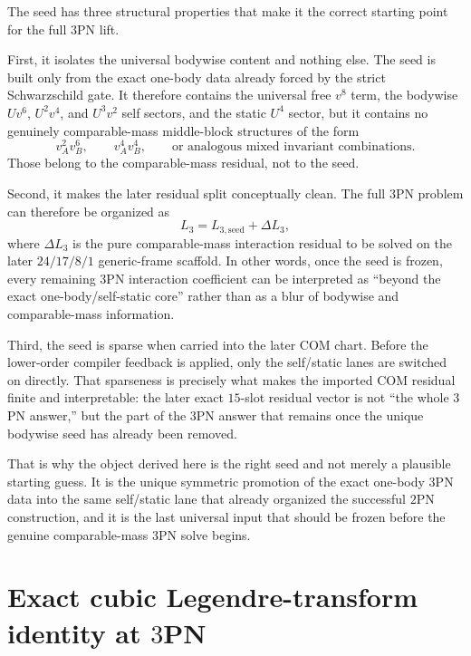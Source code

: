 \documentclass[11pt]{article}
\begin{document}
The seed has three structural properties that make it the correct starting point
for the full $3$PN lift.

First, it isolates the universal bodywise content and nothing else.  The seed is
built only from the exact one-body data already forced by the strict
Schwarzschild gate.  It therefore contains the universal free $v^8$ term, the
bodywise $Uv^6$, $U^2v^4$, and $U^3v^2$ self sectors, and the static $U^4$
sector, but it contains no genuinely comparable-mass middle-block structures of
the form
\[
v_A^2v_B^6,
\qquad
v_A^4v_B^4,
\qquad
\text{or analogous mixed invariant combinations.}
\]
Those belong to the comparable-mass residual, not to the seed.

Second, it makes the later residual split conceptually clean.  The full $3$PN
problem can therefore be organized as
\begin{equation}
L_3=L_{3,\mathrm{seed}}+\Delta L_3,
\label{eq:app-self-static-seed-split}
\end{equation}
where $\Delta L_3$ is the pure comparable-mass interaction residual to be solved
on the later $24/17/8/1$ generic-frame scaffold.  In other words, once the seed
is frozen, every remaining $3$PN interaction coefficient can be interpreted as
``beyond the exact one-body/self-static core'' rather than as a blur of bodywise
and comparable-mass information.

Third, the seed is sparse when carried into the later COM chart.  Before the
lower-order compiler feedback is applied, only the self/static lanes are
switched on directly.  That sparseness is precisely what makes the imported COM
residual finite and interpretable: the later exact $15$-slot residual vector is
not ``the whole $3$PN answer,'' but the part of the $3$PN answer that remains
once the unique bodywise seed has already been removed.

That is why the object derived here is the right seed and not merely a plausible
starting guess.  It is the unique symmetric promotion of the exact one-body
$3$PN data into the same self/static lane that already organized the successful
$2$PN construction, and it is the last universal input that should be frozen
before the genuine comparable-mass $3$PN solve begins.


\section{Exact cubic Legendre-transform identity at \texorpdfstring{$3$}{3}PN}
\label{app:cubic-legendre}
\end{document}
